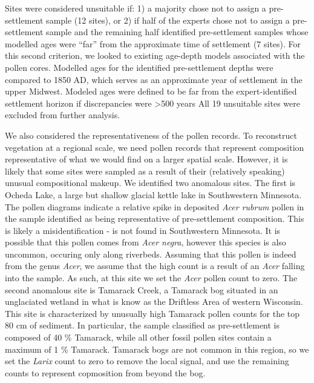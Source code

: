 \documentclass[12pt]{article}
\begin{document}

Sites were considered unsuitable if: 1) a majority chose not to assign
a pre-settlement sample (12 sites), or 2) if half of the experts chose
not to assign a pre-settlement sample and the remaining half
identified pre-settlement samples whose modelled ages were “far” from
the approximate time of settlement (7 sites). For this second
criterion, we looked to existing age-depth models associated with the
pollen cores. Modelled ages for the identified pre-settlement depths
were compared to 1850 AD, which serves as an approximate year of
settlement in the upper Midwest.  Modeled ages were defined to be far
from the expert-identified settlement horizon if discrepancies were
>500 years All 19 unsuitable sites were excluded from further
analysis.

We also considered the representativeness of the pollen records. To
reconstruct vegetation at a regional scale, we need pollen records
that represent composition representative of what we would find on a
larger spatial scale. However, it is likely that some sites were
sampled as a result of their (relatively speaking) unusual
compositional makeup. We identified two anomalous sites. The first is
Ocheda Lake, a large but shallow glacial kettle lake in Southwestern
Minnesota. The pollen diagrams indicate a relative spike in deposited
\textit{Acer rubrum} pollen in the sample identified as being
representative of pre-settlement composition. This is likely a
misidentification -  is not found in Southwestern
Minnesota. It is possible that this pollen comes from \textit{Acer
  negra}, however this species is also uncommon, occuring only along
riverbeds. Assuming that this pollen is indeed from the genus
\textit{Acer}, we assume that the high count is a result of an
\textit{Acer} falling into the sample. As such, at this site we set
the \textit{Acer} pollen count to zero. The second anomalous site is
Tamarack Creek, a Tamarack bog situated in an unglaciated wetland in
what is know as the Driftless Area of western Wisconsin. This site is
characterized by unusually high Tamarack pollen counts for the top 80
cm of sediment. In particular, the sample classified as pre-settlement
is composed of 40 \% Tamarack, while all other fossil pollen sites
contain a maximum of 1 \% Tamarack. Tamarack bogs are not common in
this region, so we set the \textit{Larix} count to zero to remove the
local signal, and use the remaining counts to represent copmosition
from beyond the bog.
\end{document}
